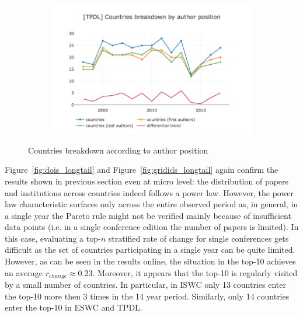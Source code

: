 \documentclass{llncs}
\begin{document}
\begin{figure}[t]
\begin{subfigure}{.5\textwidth}
	\includegraphics[width=\textwidth]{images/tpdl_countries_vs_authors.png}
	\caption[ ]{}
	\label{fig:tpdl_countries_vs_authors}
\end{subfigure}
\caption{Countries breakdown according to author position}
\label{fig:countries_vs_authors}
\end{figure}

Figure~\ref{fig:dois_longtail} and Figure~\ref{fig:gridids_longtail} again confirm the results shown in previous section even at micro level: the distribution of papers and institutions across countries indeed follows a power law.
However, the power law characteristic surfaces only across the entire observed period as, in general, in a single year the Pareto rule might not be verified mainly because of insufficient data points (i.e. in a single conference edition the number of papers is limited).
In this case, evaluating a top-$n$ stratified rate of change for single conferences gets difficult as the set of countries participating in a single year can be quite limited.
However, as can be seen in the results online, the situation in the top-10 achieves an average $r_{change} \approx 0.23$.
Moreover, it appears that the top-10 is regularly visited by a small number of countries. 
In particular, in ISWC only 13 countries enter the top-10 more then 3 times in the 14 year period.
Similarly, only 14 countries enter the top-10 in ESWC and TPDL. 
\end{document}
